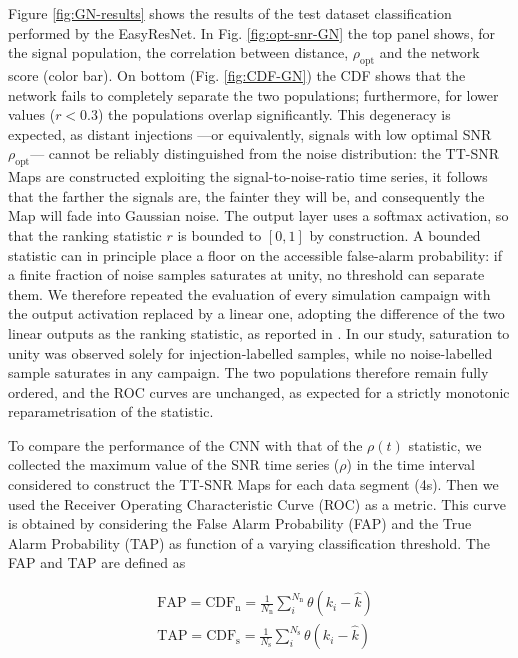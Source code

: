 \documentclass[aps,prd,twocolumn,superscriptaddress,nofootinbib, longbibliography]{revtex4-2}
\begin{document}
	Figure \ref{fig:GN-results} shows the results of the test dataset classification performed by the EasyResNet. In Fig. \ref{fig:opt-snr-GN} the top panel shows, for the signal population, the correlation between distance, $\rho_\mathrm{opt}$ and the network score (color bar). On bottom (Fig. \ref{fig:CDF-GN}) the CDF shows that the network fails to completely separate the two populations; furthermore, for lower values ($r < 0.3$) the populations overlap significantly. This degeneracy is expected, as distant injections ---or equivalently, signals with low optimal SNR $\rho_\mathrm{opt}$--- cannot be reliably distinguished from the noise distribution: the TT-SNR Maps are constructed exploiting the signal-to-noise-ratio time series, it follows that the farther the signals are, the fainter they will be, and consequently the Map will fade into Gaussian noise. 
	The output layer uses a softmax activation, so that the ranking statistic $r$ is bounded to $[0,1]$ by construction. A bounded statistic can in principle place a floor on the accessible false-alarm probability: if a finite fraction of noise samples saturates at unity, no threshold can separate them. We therefore repeated the evaluation of every simulation campaign with the output activation replaced by a linear one, adopting the difference of the two linear outputs as the ranking statistic, as reported in \cite{mlgwsc1_mock}. In our study, saturation to unity was observed solely for injection-labelled samples, while no noise-labelled sample saturates in any campaign. The two populations therefore remain fully ordered, and the ROC curves are unchanged, as expected for a strictly monotonic reparametrisation of the statistic. 
	
	 To compare the performance of the CNN with that of the $\rho(t)$ statistic, we collected the maximum value of the SNR time series ($\rho$) in the time interval considered to construct the TT-SNR Maps for each data segment (4s). Then we used the Receiver Operating Characteristic Curve (ROC) as a metric. This curve is obtained by considering the False Alarm Probability (FAP) and the True Alarm Probability (TAP) as function of a varying classification threshold. The FAP and TAP are defined as

\begin{align}
	& \mathrm{FAP} = \mathrm{CDF}_\mathrm{n} =  \frac{1}{N_\mathrm{n}}\sum_i^{N_\mathrm{n}} \theta( k_i - \hat{k}) \\
	& \mathrm{TAP} = \mathrm{CDF}_\mathrm{s} = \frac{1}{N_\mathrm{s}}\sum_i^{N_\mathrm{s}} \theta( k_i - \hat{k})
\end{align}
\end{document}
